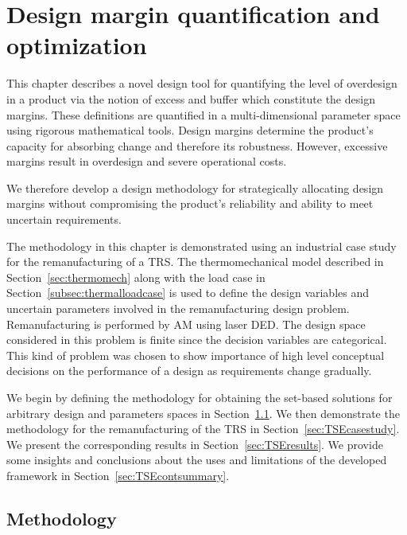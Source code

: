 \chapter{Design margin quantification and optimization}
\label{ch:TSEcont}

This chapter describes a novel design tool for quantifying the level of overdesign in a product via the notion of excess and buffer which constitute the design margins. These definitions are quantified in a multi-dimensional parameter space using rigorous mathematical tools. Design margins determine the product's capacity for absorbing change and therefore its robustness. However, excessive margins result in overdesign and severe operational costs.

We therefore develop a design methodology for strategically allocating design margins without compromising the product's reliability and ability to meet uncertain requirements.

The methodology in this chapter is demonstrated using an industrial case study for the remanufacturing of a \ac{TRS}. The thermomechanical model described in Section~\ref{sec:thermomech} along with the load case in Section~\ref{subsec:thermalloadcase} is used to define the design variables and uncertain parameters involved in the remanufacturing design problem. Remanufacturing is performed by \ac{AM} using laser \ac{DED}. The design space considered in this problem is finite since the decision variables are categorical. This kind of problem was chosen to show importance of high level conceptual decisions on the performance of a design as requirements change gradually.

We begin by defining the methodology for obtaining the set-based solutions for arbitrary design and parameters spaces in Section~\ref{sec:TSEmethods}. We then demonstrate the methodology for the remanufacturing of the \ac{TRS} in Section~\ref{sec:TSEcasestudy}. We present the corresponding results in Section~\ref{sec:TSEresults}. We provide some insights and conclusions about the uses and limitations of the developed framework in Section~\ref{sec:TSEcontsummary}.

\section{Methodology} \label{sec:TSEmethods}

